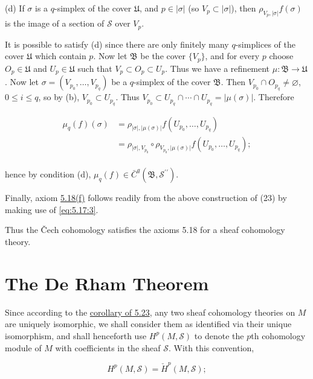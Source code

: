 (d) If $\sigma$ is a $q$-simplex of the cover $\mathfrak{U}$, and $p\in|\sigma|$ (so $V_{p}\subset|\sigma|$), then $\rho_{V_{p},|\sigma|}f(\sigma)$ is the image of a section of $\mathcal{S}$ over $V_{p}$.

It is possible to satisfy (d) since there are only finitely many $q$-simplices of the cover $\mathfrak{U}$ which contain $p$. Now let $\mathfrak{B}$ be the cover $\{V_p\}$, and for every $p$ choose $O_p \in \mathfrak{U}$ and $U_p \in \mathfrak{U}$ such that $V_p \subset O_p \subset U_p$. Thus we have a refinement $\mu: \mathfrak{B} \to \mathfrak{U}$. Now let $\sigma = (V_{p_0}, \ldots, V_{p_q})$ be a $q$-simplex of the cover $\mathfrak{B}$. Then $V_{p_0} \cap O_{p_q} \neq \varnothing$, $0 \leq i \leq q$, so by (b), $V_{p_0} \subset U_{p_q}$. Thus $V_{p_0} \subset U_{p_q} \cap \cdots \cap U_{p_q} = |\mu(\sigma)|$. Therefore

\[
\begin{aligned}{\mu_{q}(f)(\sigma)}&{{}=\rho_{|\sigma|,|\mu(\sigma)|}f(U_{p_{0}},\ldots,U_{p_{q}})}\\ {}&{{}=\rho_{|\sigma|,V_{p_{0}}}\circ\rho_{V_{p_{0}},|\mu(\sigma)|}f(U_{p_{0}},\ldots,U_{p_{q}});}\\ \end{aligned}
\]

hence by condition (d),  $\mu_{q}(f)\in\bar{C}^{q}(\mathfrak{B},\mathcal{S}^{\prime\prime})$.

Finally, axiom \hyperref[thm:5.18]{5.18(f)} follows readily from the above construction of (23) by making use of \eqref{eq:5.17:3}.

Thus the Čech cohomology satisfies the axioms 5.18 for a sheaf cohomology theory.

\section{The De Rham Theorem}


\label{thm:5.34}Since according to the \hyperref[thm:5.23]{corollary of 5.23}, any two sheaf cohomology theories on $M$ are uniquely isomorphic, we shall consider them as identified via their unique isomorphism, and shall henceforth use $H^{p}(M,\mathcal{S})$ to denote the $p$th cohomology module of $M$ with coefficients in the sheaf $\mathcal{S}$. With this convention,

\begin{equation}
\tag{1}\label{eq:5.34:1}
H^{p}(M,\mathcal{S})=\check{H}^{p}(M,\mathcal{S});
\end{equation}

